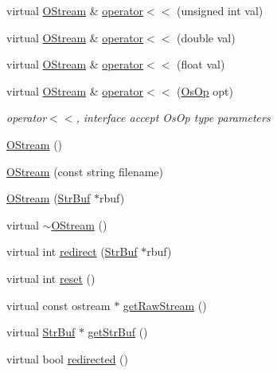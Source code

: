 \begin{DoxyCompactItemize}
\item 
virtual \hyperlink{classHSF_1_1OStream}{OStream} \& \hyperlink{classHSF_1_1OStream_aa0cd93dd86633a0603d09d35e20c9520}{operator$<$$<$} (unsigned int val)
\item 
virtual \hyperlink{classHSF_1_1OStream}{OStream} \& \hyperlink{classHSF_1_1OStream_a8c3d22e78a10c990e136c1514dfc99c6}{operator$<$$<$} (double val)
\item 
virtual \hyperlink{classHSF_1_1OStream}{OStream} \& \hyperlink{classHSF_1_1OStream_a26a658cc9ab9422d58252ef75a7ca360}{operator$<$$<$} (float val)
\item 
virtual \hyperlink{classHSF_1_1OStream}{OStream} \& \hyperlink{classHSF_1_1OStream_aa7a6f8ac15aaa2145e23f92904350b39}{operator$<$$<$} (\hyperlink{namespaceHSF_a5c97750573f23c09a9fed0efa5baa52d}{OsOp} opt)
\begin{DoxyCompactList}\small\item\em operator$<$$<$, interface accept OsOp type parameters \item\end{DoxyCompactList}\item 
\hyperlink{classHSF_1_1OStream_aa5114fea384c827743a416287447b840}{OStream} ()
\item 
\hyperlink{classHSF_1_1OStream_aeea5b502867b5796d3442dca543699ae}{OStream} (const string filename)
\item 
\hyperlink{classHSF_1_1OStream_aa9dec59af482b209a4a4d89cd6ff99e5}{OStream} (\hyperlink{namespaceHSF_a099dd77b4cb045fbbd0fb0dd0946e198}{StrBuf} $\ast$rbuf)
\item 
virtual \hyperlink{classHSF_1_1OStream_ad18f77a28e352d3e23f53eb67e7fd6fd}{$\sim$OStream} ()
\item 
virtual int \hyperlink{classHSF_1_1OStream_aedd010fc73297368032ada516d0577d8}{redirect} (\hyperlink{namespaceHSF_a099dd77b4cb045fbbd0fb0dd0946e198}{StrBuf} $\ast$rbuf)
\item 
virtual int \hyperlink{classHSF_1_1OStream_ac3d63743046e59e7f27aa3dde0f6b68c}{reset} ()
\item 
virtual const ostream $\ast$ \hyperlink{classHSF_1_1OStream_ac2d4330afcd5b968c3bbceb739785fe2}{getRawStream} ()
\item 
virtual \hyperlink{namespaceHSF_a099dd77b4cb045fbbd0fb0dd0946e198}{StrBuf} $\ast$ \hyperlink{classHSF_1_1OStream_a28f9c27531a8839602aafa81dccbb543}{getStrBuf} ()
\item 
virtual bool \hyperlink{classHSF_1_1OStream_ab478550e6310a030950dd8d8f354562b}{redirected} ()
\item 

\end{DoxyCompactItemize}
